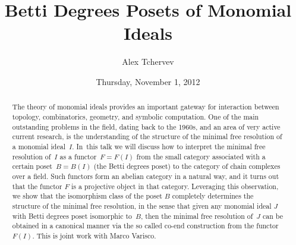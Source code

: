 \documentclass{UAmathtalk}
\author{Alex Tchervev}
\title{Betti Degrees Posets of Monomial Ideals}
\date{Thursday, November 1, 2012}
\begin{document}
\maketitle

\begin{abstract}
The theory of monomial ideals provides an important gateway for interaction between topology, combinatorics, geometry, and symbolic computation. One of the main outstanding problems in the field, dating back to the 1960s, and an area of very active current research, is the understanding of the structure of the minimal free resolution of a monomial ideal~$I$. In~this talk we will discuss how to interpret the minimal free resolution of~$I$ as a functor~$F=F(I)$ from the small category associated with a certain poset~$B=B(I)$ (the Betti degrees poset) to the category of chain complexes over a field. Such functors form an abelian category in a natural way, and it turns out that the functor $F$ is a projective object in that category. Leveraging this observation, we show that the isomorphism class of the poset $B$ completely determines the structure of the minimal free resolution, in the sense that given any monomial ideal $J$ with Betti degrees poset isomorphic to~$B$, then the minimal free resolution of~$J$ can be obtained in a canonical manner via the so called co-end construction from the functor~$F(I)$. This is joint work with Marco Varisco.
\end{abstract}
\end{document}
